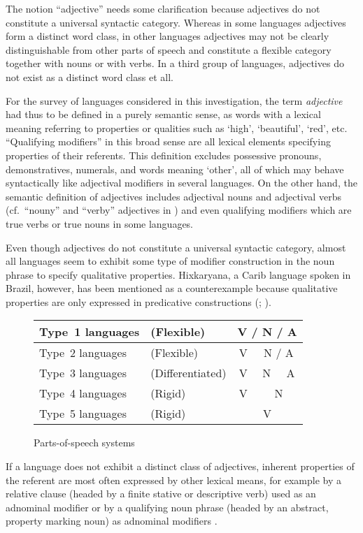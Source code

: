 The notion “adjective” needs some clarification because adjectives do not constitute a universal syntactic category. Whereas in some languages adjectives form a distinct word class, in other languages adjectives may not be clearly distinguishable from other parts of speech and constitute a flexible category together with nouns or with verbs. In a third group of languages, adjectives do not exist as a distinct word class et all.

For the survey of languages considered in this investigation, the term \emph{adjective} had thus to be defined in a purely semantic sense, as words with a lexical meaning referring to properties or qualities such as ‘high’, ‘beautiful’, ‘red’, etc. “Qualifying modifiers” \citep[100, elsewhere]{rijkhoff2002} in this broad sense are all lexical elements specifying properties of their referents. This definition excludes possessive pronouns, demonstratives, numerals, and words meaning ‘other’, all of which may behave syntactically like adjectival modifiers in several languages. On the other hand, the semantic definition of adjectives includes adjectival nouns and adjectival verbs (cf.~“nouny” and “verby” adjectives in \citet[25–34, elsewhere]{wetzer1996}) and even qualifying modifiers which are true verbs or true nouns in some languages.

Even though adjectives do not constitute a universal syntactic category, almost all languages seem to exhibit some type of modifier construction in the noun phrase to specify qualitative properties. Hixkaryana, a Carib language spoken in Brazil, however, has been mentioned as a counterexample because qualitative properties are only expressed in predicative constructions (\citealt[37, 131]{derbyshire1979}; \citealt[138]{rijkhoff2002}).
\begin{figure}
\begin{tabular}{|| ll || c | c | c ||}
\hline\hline
Type~1 languages &(Flexible)&\multicolumn{3}{c||}{V / N / A}\\
\hline
Type~2 languages&(Flexible)&V&\multicolumn{2}{c||}{N / A}\\
\hline
Type~3 languages&(Differentiated)&V&N&A\\
\hline
Type~4 languages&(Rigid)&V&\multicolumn{2}{c||}{N}\\
\hline
Type~5 languages&(Rigid)&\multicolumn{3}{c||}{V}\\
\hline\hline
\end{tabular}
\caption[Parts-of-speech systems]{Parts-of-speech systems \citep[based on][]{hengeveld-etal2004}}
\label{hengeveld adj}
\end{figure}
If a language does not exhibit a distinct class of adjectives, inherent properties of the referent are most often expressed by other lexical means, for example by a relative clause (headed by a finite stative or descriptive verb) used as an adnominal modifier or by a qualifying noun phrase (headed by an abstract, property marking noun) as adnominal modifiers \citep[cf.][100]{rijkhoff2002}.

